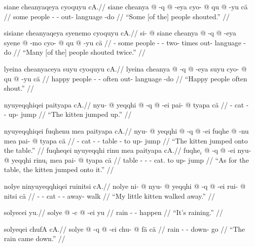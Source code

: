 \documentclass{article}
\begin{document}
\ex[lingstyle=QuCheanya] \begingl
\glpreamble siane cheanyaqeya cyoquyu cA.//
\gla siane cheanya @ -q @ -eya cyo- @ qu @ -yu c\"a //
\glb some people - - out- language -do  //
\glft ``Some [of the] people shouted.'' //
\endgl \xe

\ex[lingstyle=QuCheanya] \begingl
\glpreamble sisiane cheanyaqeya syenemo cyoquyu cA.//
\gla si- @ siane cheanya @ -q @ -eya syene @ -mo cyo- @ qu @ -yu c\"a //
\glb {}- some people - - two- times out- language -do  //
\glft ``Many [of the] people shouted twice.'' //
\endgl \xe

\ex[lingstyle=QuCheanya] \begingl
\glpreamble lyeina cheanyaceya suyu cyoquyu cA.//
\gla lyeina cheanya @ -q @ -eya suyu cyo- @ qu @ -yu c\"a //
\glb happy people - - often out- language -do  //
\glft ``Happy people often shout.'' //
\endgl \xe

\ex[lingstyle=QuCheanya] \begingl
\glpreamble nyuyeqqhiqei paityapa cA.//
\gla nyu- @ yeqqhi @ -q @ -ei pai- @ tyapa c\"a //
\glb {}- cat - - up- jump  //
\glft ``The kitten jumped up.'' //
\endgl \xe

\pex[lingstyle=QuCheanya] 
\a \begingl
\glpreamble nyuyeqqhiqei fuqhenu mea paityapa cA.//
\gla nyu- @ yeqqhi @ -q @ -ei fuqhe @ -nu mea pai- @ tyapa c\"a //
\glb {}- cat - - table - to up- jump  //
\glft ``The kitten jumped onto the table.'' //
\endgl
\a \begingl
\glpreamble fuqheqei nyuyeqqhi rinu mea paityapa cA.//
\gla fuqhe$_i$ @ -q @ -ei nyu- @ yeqqhi rinu$_i$ mea pai- @ tyapa c\"a //
\glb table - - - cat.  to up- jump  //
\glft ``As for the table, the kitten jumped onto it.'' //
\endgl \xe

\ex[lingstyle=QuCheanya] \begingl
\glpreamble nolye ninyuyeqqhiqei ruinitsi cA.//
\gla nolye ni- @ nyu- @ yeqqhi @ -q @ -ei rui- @ nitsi c\"a //
\glb {} - - cat - - away- walk  //
\glft ``My little kitten walked away.'' //
\endgl \xe

\ex[lingstyle=QuCheanya] \begingl
\glpreamble solyecei yu.//
\gla solye @ -c @ -ei yu //
\glb rain - - happen //
\glft ``It's raining.'' //
\endgl \xe

\ex[lingstyle=QuCheanya] \begingl
\glpreamble solyeqei chufA cA.//
\gla solye @ -q @ -ei chu- @ f\"a c\"a //
\glb rain - - down- go  //
\glft ``The rain came down.'' //
\endgl \xe
\end{document}
